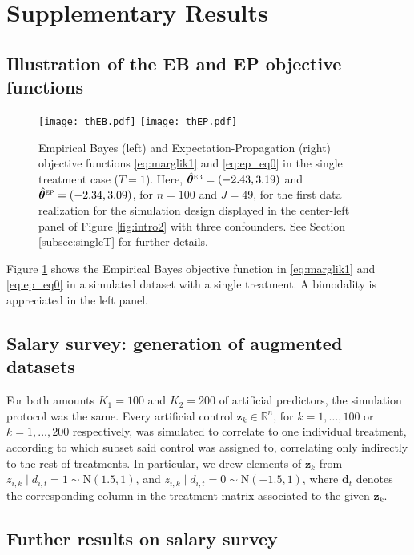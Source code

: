 \documentclass[12pt]{article}
\newcommand{\mb}[1]{\mathbf{#1}}
\newcommand{\bd}{{\mb{d}}}
\newcommand{\btheta}{{\bm{\theta}}}
\newcommand{\hthetaeb}{\hat{\btheta}^{\textsc{eb}}}
\newcommand{\hthetaep}{\hat{\btheta}^{\textsc{ep}}}
\begin{document}
\section{Supplementary Results}


\subsection{Illustration of the EB and EP objective functions}

\begin{figure}[h]
\centering
\texttt{[image: thEB.pdf]} 
\texttt{[image: thEP.pdf]} 
\caption{Empirical Bayes (left) and Expectation-Propagation (right) objective functions \eqref{eq:marglik1} and \eqref{eq:ep_eq0} in the single treatment case ($T=1$). Here, $\hthetaeb = (-2.43, 3.19)$ and $\hthetaep = (-2.34, 3.09)$, for $n=100$ and $J=49$, for the first data realization for the simulation design displayed in the center-left panel of Figure \ref{fig:intro2} with three confounders. See Section \ref{subsec:singleT} for further details.}
\label{fig:thEPEB}
\end{figure}


Figure \ref{fig:thEPEB} shows the Empirical Bayes objective function in \eqref{eq:marglik1} and \eqref{eq:ep_eq0} in a simulated dataset with a single treatment. A bimodality is appreciated in the left panel.

\subsection{Salary survey: generation of augmented datasets} \label{sec:fakepreds_supp}

For both amounts $K_1=100$ and $K_2=200$ of artificial predictors, the simulation protocol was the same. Every artificial control $\mb{z}_{k} \in \mathbb{R}^{n}$, for $k=1,\dots,100$ or $k=1,\dots,200$ respectively, was simulated to correlate to one individual treatment, according to which subset said control was assigned to, correlating only indirectly to the rest of treatments. In particular, we drew elements of $\mb{z}_{k}$ from $z_{i,k} \mid d_{i,t} = 1 \sim \text{N}(1.5, 1)$, and $z_{i,k} \mid d_{i,t} = 0 \sim \text{N}(-1.5, 1)$, where $\bd_{t}$ denotes the corresponding column in the treatment matrix associated to the given $\mb{z}_{k}$. 

\subsection{Further results on salary survey} \label{sec:salary_supp}
\end{document}
